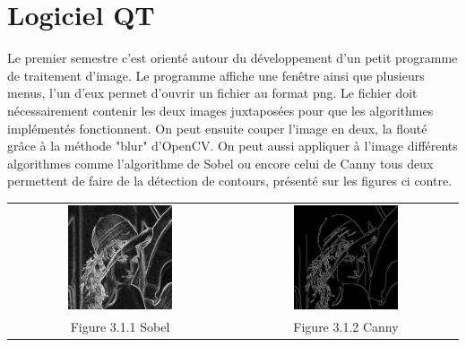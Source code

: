 \documentclass[12pt,a4paper]{report}
\begin{document}
\section{Logiciel QT}
Le premier semestre c'est orienté autour du développement d'un petit programme de traitement d'image. Le programme affiche une fenêtre ainsi que plusieurs menus, l'un d'eux permet d'ouvrir un fichier au format png.
Le fichier doit nécessairement contenir les deux images juxtaposées pour que les algorithmes implémentés fonctionnent. On peut ensuite couper l'image en deux, la flouté grâce à la méthode "blur" d'OpenCV. On peut aussi appliquer à l'image différents algorithmes comme l'algorithme de Sobel ou encore celui de Canny tous deux permettent de faire de la détection de contours, présenté sur les figures ci contre.
\begin{center}
\begin{tabular}{cc}
  \vspace{0pt} \includegraphics[width=0.49\textwidth]{sobel.jpg} &
  \vspace{0pt} \includegraphics[width=0.49\textwidth]{canny.jpg} \\
    
  Figure 3.1.1 Sobel & Figure 3.1.2 Canny
\end{tabular}
\end{center}
\end{document}
